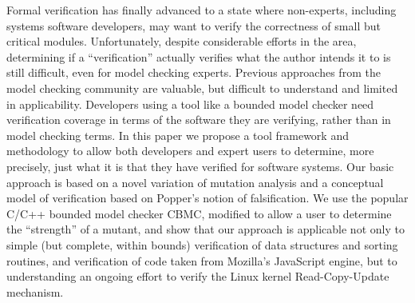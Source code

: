 Formal verification has finally advanced to a state where non-experts, including systems software developers, may want to verify the correctness of small but critical modules.  Unfortunately, despite considerable efforts in the area, determining if a ``verification'' actually verifies what the author intends it to is still difficult, even for model checking experts.  Previous approaches from the model checking community are valuable, but difficult to understand and limited in applicability.  Developers using a tool like a bounded model checker need verification coverage in terms of the software they are verifying, rather than in model checking terms.  In this paper we propose a tool framework and methodology to allow both developers and expert users to determine, more precisely, just what it is that they have verified for software systems.  Our basic approach is based on a novel variation of mutation analysis and a conceptual model of verification based on Popper's notion of falsification.  We use the popular C/C++ bounded model checker CBMC, modified to allow a user to determine the ``strength'' of a mutant, and show that our approach is applicable not only to simple (but complete, within bounds) verification of data structures and sorting routines, and verification of code taken from Mozilla's JavaScript engine, but to understanding an ongoing effort to verify the Linux kernel Read-Copy-Update mechanism.
